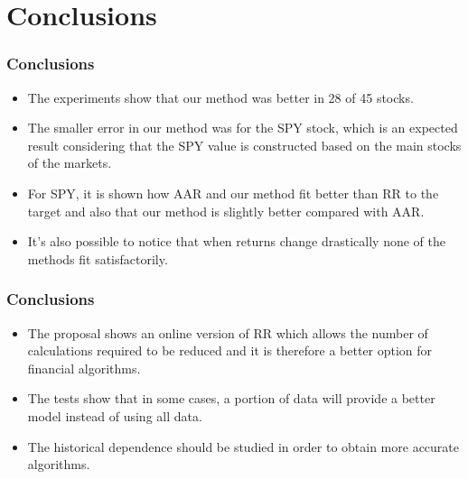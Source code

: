 \section{Conclusions} %
\label{sec:Conclusions}

\begin{frame}
     \frametitle{Conclusions}
    \begin{itemize}
        \item The experiments show that our method was better in 28 of
45 stocks.
        \item The smaller error in our method was for the SPY stock,
        which is an expected result considering that the SPY value is
        constructed based on the main stocks of the markets.
        \item For SPY, it is shown how AAR and
        our method fit better than RR to the target and also that our
        method is slightly better compared with AAR.
        \item It's also possible to notice that when returns change
        drastically none of the methods fit satisfactorily.
    \end{itemize}
\end{frame}

\begin{frame}
     \frametitle{Conclusions}
    \begin{itemize}
    \item The proposal shows an online version of RR which allows the
    number of calculations required to be reduced and it is therefore a better
    option for financial algorithms.
    \item The tests show that in some cases, a portion of data will
    provide a better model instead of using all data.
    \item The historical dependence should be studied in order to
    obtain more accurate algorithms.
    \end{itemize}
\end{frame}

